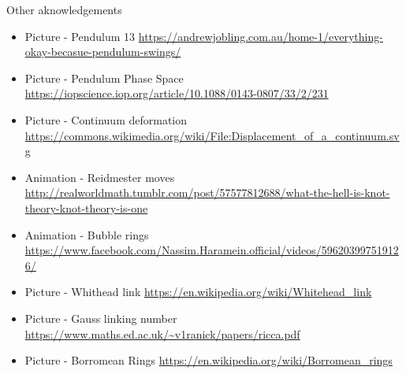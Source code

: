 \documentclass[handout,10pt]{beamer}
\begin{document}
\begin{frame}[t]{Other aknowledgements}
	\begin{itemize}
		\item Picture - Pendulum 13
			\url{https://andrewjobling.com.au/home-1/everything-okay-becasue-pendulum-swings/}
		\item Picture - Pendulum Phase Space
			\url{https://iopscience.iop.org/article/10.1088/0143-0807/33/2/231}
				\item Picture - Continuum deformation
			\url{https://commons.wikimedia.org/wiki/File:Displacement_of_a_continuum.svg}
		\item Animation - Reidmester moves
			\url{http://realworldmath.tumblr.com/post/57577812688/what-the-hell-is-knot-theory-knot-theory-is-one}
		\item Animation - Bubble rings
			\url{https://www.facebook.com/Nassim.Haramein.official/videos/596203997519126/}
		\item Picture - Whithead link 
			\url{https://en.wikipedia.org/wiki/Whitehead_link}
		\item Picture - Gauss linking number 
			\url{https://www.maths.ed.ac.uk/~v1ranick/papers/ricca.pdf}
		\item Picture - Borromean Rings
			\url{https://en.wikipedia.org/wiki/Borromean_rings}	
	\end{itemize}
\end{frame}


\end{document}
